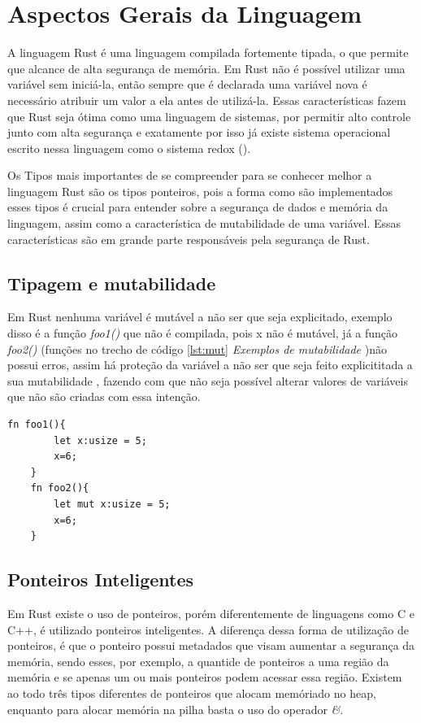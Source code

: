 \documentclass[rel_mlp]{iiufrgs}
\begin{document}
\section{Aspectos Gerais da Linguagem}
A linguagem Rust é uma linguagem compilada fortemente tipada, o que permite que alcance de alta segurança de memória. Em Rust não é possível utilizar uma variável sem iniciá-la, então sempre que é declarada uma variável nova é necessário atribuir um valor a ela antes de utilizá-la. Essas características fazem que Rust seja ótima como uma linguagem de sistemas, por permitir alto controle junto com alta segurança e exatamente por isso já existe sistema operacional escrito nessa linguagem como o sistema redox (\citet{Redox}). 

Os Tipos mais importantes de se compreender para se conhecer melhor a linguagem Rust são os tipos ponteiros, pois a forma como são implementados esses tipos é crucial para entender sobre a segurança de dados e memória da linguagem, assim como a característica de mutabilidade de uma variável. Essas características são em grande parte responsáveis pela segurança de Rust.

\subsection{Tipagem e mutabilidade}

 Em Rust nenhuma variável é mutável a não ser que seja explicitado, exemplo disso é a função \textit{foo1()}  que não é compilada, pois x não é mutável, já a função \textit{foo2()} (funções no trecho de código \ref{lst:mut} \textit{Exemplos de mutabilidade} )não possui erros, assim há proteção da variável a não ser que seja feito explicititada a sua mutabilidade , fazendo com que não seja possível alterar valores de variáveis que não são criadas com essa intenção.

\begin{lstlisting}[frame=single, label={lst:mut}, caption={Exemplos de mutabilidade}]
    fn foo1(){
        let x:usize = 5;
        x=6;
    }
    fn foo2(){
        let mut x:usize = 5;
        x=6;
    }
 \end{lstlisting}

\subsection{Ponteiros Inteligentes}
Em Rust existe o uso de ponteiros, porém diferentemente de linguagens como C e C++, é utilizado ponteiros inteligentes. A diferença dessa forma de utilização de ponteiros, é que o ponteiro possui metadados que visam aumentar a segurança da memória, sendo esses, por exemplo, a quantide de ponteiros a uma região da memória e se apenas um ou mais ponteiros podem acessar essa região. Existem ao todo três tipos diferentes de ponteiros que alocam memóriado no heap, enquanto para alocar memória na pilha basta o uso do operador \textit{\&}. 
\end{document}
